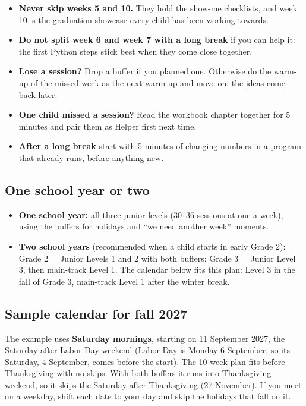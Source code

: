 \documentclass[track=junior,level=3,teacher]{kidscode}
\begin{document}
\begin{tip}
\begin{itemize}[itemsep=2pt]
  \item \textbf{Never skip weeks 5 and 10.} They hold the show-me checklists, and week 10 is the
        graduation showcase every child has been working towards.
  \item \textbf{Do not split week 6 and week 7 with a long break} if you can help it: the first
        Python steps stick best when they come close together.
  \item \textbf{Lose a session?} Drop a buffer if you planned one. Otherwise do the warm-up of the
        missed week as the next warm-up and move on: the ideas come back later.
  \item \textbf{One child missed a session?} Read the workbook chapter together for 5 minutes and pair
        them as Helper first next time.
  \item \textbf{After a long break} start with 5 minutes of changing numbers in a program that already
        runs, before anything new.
\end{itemize}
\end{tip}

\subsection{One school year or two}
\begin{itemize}[itemsep=2pt]
  \item \textbf{One school year:} all three junior levels (30--36 sessions at one a week), using the
        buffers for holidays and \enquote{we need another week} moments.
  \item \textbf{Two school years} (recommended when a child starts in early Grade 2):
        Grade 2 = Junior Levels 1 and 2 with both buffers; Grade 3 = Junior Level 3, then main-track
        Level 1. The calendar below fits this plan: Level 3 in the fall of Grade 3, main-track Level 1
        after the winter break.
\end{itemize}

\subsection{Sample calendar for fall 2027}
The example uses \textbf{Saturday mornings}, starting on 11 September 2027, the Saturday after
Labor Day weekend (Labor Day is Monday 6 September, so its Saturday, 4 September, comes before the
start). The 10-week plan fits before Thanksgiving with no skips. With both buffers it runs into
Thanksgiving weekend, so it skips the Saturday after Thanksgiving (27 November). If you meet on a
weekday, shift each date to your day and skip the holidays that fall on it.
\end{document}
